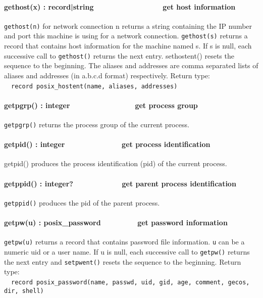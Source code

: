 \paragraph[gethost(x) : record|string\ \ \ \ \ \ \ \ \ \ 
\ \ \ \ \ \ \ get host information]{gethost(x) :
record|string\ \ \ \ \ \ \ \ \ \  \ \ \ \ \ \ \ get host information}

\texttt{gethost(n)} for network connection n returns a string containing
the IP number and port this machine is using for a network connection.
\texttt{gethost(s)} returns a record that contains host information for the
machine named s. If s is null, each successive call to \texttt{gethost()}
returns the next entry. sethostent() resets the sequence to the
beginning. The aliases and addresses are comma separated lists of
aliases and addresses (in a.b.c.d format) respectively. Return
type:\\
\ \ \texttt{record posix\_hostent(name, aliases, addresses)}

\paragraph[getpgrp() : integer\ \ \ \ \ \ \ \ \ \ \ \ \ \  \ \ get
process group]{getpgrp() : integer\ \ \ \ \ \ \ \ \ \ \ \ \ \  \ \ get
process group}
\texttt{getpgrp()} returns the process group of the current process. 

\paragraph[getpid() : integer\ \ \ \ \ \ \ \ \ \ \ \  \ \ get process
identification]{getpid() : integer\ \ \ \ \ \ \ \ \ \ \ \  \ \ get
process identification}
getpid() produces the process identification (pid) of the current
process.

\paragraph[getppid() : integer?\ \ \ \ \ \ \ \ \ \  \ \ get parent
process identification]{getppid() : integer?\ \ \ \ \ \ \ \ \ \ 
\ \ get parent process identification}
\texttt{getppid()} produces the pid of the parent process.

\paragraph[getpw(u) : posix\_password\ \ \ \ \ \ \ \  \ get password
information]{getpw(u) : posix\_password\ \ \ \ \ \ \ \  \ get password
information}
\texttt{getpw(u)} returns a record that contains password file
information. \texttt{u} can
be a numeric uid or a user name. If u is null, each successive call to
\texttt{getpw()} returns the next entry and \texttt{setpwent()} resets
the sequence to the beginning. Return type:\\
\ \ \texttt{record posix\_password(name, passwd, uid, gid, age, comment, gecos,
dir, shell)}


